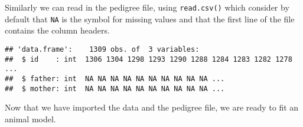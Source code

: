 \documentclass[12pt,]{book}
\newenvironment{Shaded}{\begin{snugshade}}{\end{snugshade}}
\newcommand{\KeywordTok}[1]{\textcolor[rgb]{0.13,0.29,0.53}{\textbf{#1}}}
\newcommand{\NormalTok}[1]{#1}
\newcommand{\OperatorTok}[1]{\textcolor[rgb]{0.81,0.36,0.00}{\textbf{#1}}}
\newcommand{\StringTok}[1]{\textcolor[rgb]{0.31,0.60,0.02}{#1}}
\begin{document}
\begin{Shaded}
\end{Shaded}

Similarly we can read in the pedigree file, using \texttt{read.csv()} which consider by default that \texttt{NA} is the symbol for missing values and that the first line of the file contains the column headers.

\begin{verbatim}
## 'data.frame':    1309 obs. of  3 variables:
##  $ id    : int  1306 1304 1298 1293 1290 1288 1284 1283 1282 1278 ...
##  $ father: int  NA NA NA NA NA NA NA NA NA NA ...
##  $ mother: int  NA NA NA NA NA NA NA NA NA NA ...
\end{verbatim}

\begin{Shaded}
\end{Shaded}

Now that we have imported the data and the pedigree file, we are ready to fit an animal model.
\end{document}
